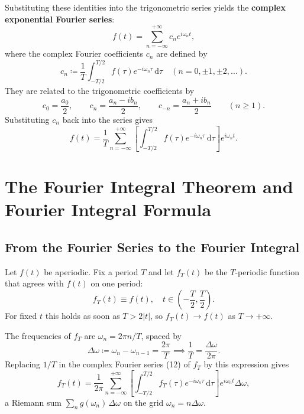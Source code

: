 \documentclass[11pt,a4paper]{article}
\theoremstyle{definition}
\theoremstyle{plain}
\begin{document}
Substituting these identities into the trigonometric series yields the \textbf{complex exponential Fourier series}:
\begin{equation}
f(t) = \sum_{n=-\infty}^{+\infty} c_n e^{i\omega_n t},
\end{equation}
where the complex Fourier coefficients $c_n$ are defined by
\begin{equation}
c_n \coloneqq \frac{1}{T} \int_{-T/2}^{T/2} f(\tau) e^{-i\omega_n \tau} \, \mathrm{d}\tau \quad (n = 0, \pm 1, \pm 2, \dots).
\end{equation}
They are related to the trigonometric coefficients by
\begin{equation}
c_0 = \frac{a_0}{2}, \qquad c_n = \frac{a_n - i b_n}{2}, \qquad c_{-n} = \frac{a_n + i b_n}{2} \qquad (n \ge 1).
\end{equation}
Substituting $c_n$ back into the series gives
\begin{equation}
f(t) = \frac{1}{T} \sum_{n=-\infty}^{+\infty} \left[ \int_{-T/2}^{T/2} f(\tau) e^{-i\omega_n \tau} \, \mathrm{d}\tau \right] e^{i\omega_n t}.
\end{equation}

\section{The Fourier Integral Theorem and Fourier Integral Formula}

\subsection{From the Fourier Series to the Fourier Integral}

Let $f(t)$ be aperiodic. Fix a period $T$ and let $f_T(t)$ be the $T$-periodic function that agrees with $f(t)$ on one period:
\begin{equation}
f_T(t) \equiv f(t), \quad t \in \left(-\frac{T}{2}, \frac{T}{2}\right).
\end{equation}
For fixed $t$ this holds as soon as $T > 2|t|$, so $f_T(t) \to f(t)$ as $T \to +\infty$.

The frequencies of $f_T$ are $\omega_n = 2\pi n/T$, spaced by
\begin{equation}
\Delta \omega \coloneqq \omega_n - \omega_{n-1} = \frac{2\pi}{T} \implies \frac{1}{T} = \frac{\Delta \omega}{2\pi}.
\end{equation}
Replacing $1/T$ in the complex Fourier series (12) of $f_T$ by this expression gives
\begin{equation}
f_T(t) = \frac{1}{2\pi} \sum_{n=-\infty}^{+\infty} \left[ \int_{-T/2}^{T/2} f_T(\tau) e^{-i\omega_n \tau} \, \mathrm{d}\tau \right] e^{i\omega_n t} \Delta \omega,
\end{equation}
a Riemann sum $\sum_n g(\omega_n)\,\Delta\omega$ on the grid $\omega_n = n\Delta\omega$.
\end{document}
